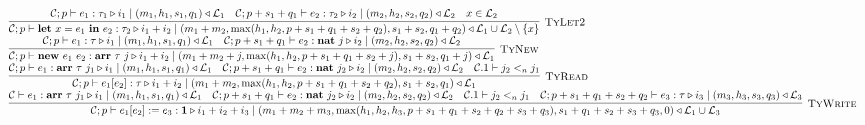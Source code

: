 \documentclass[fleqn]{article}
\begin{document}
\[\begin{array}{l}
\infer[\textsc{TyLet2}]{\jtygc{\mathcal{C};p }{ \mathbf{let}~x=e_1~\mathbf{in}~e_2 }{ \tau_2 }{ i_1 + i_2 }{ m_1 + m_2}{\max(h_1,h_2,p+s_1+q_1+s_2+q_2)}{s_1+s_2}{q_1+q_2}{\mathcal{L}_1 \cup \mathcal{L}_2 \setminus \{x\}} }{\jtygc{\mathcal{C};p }{ e_1 }{ \tau_1 }{ i_1 }{ m_1 }{h_1}{s_1}{q_1}{\mathcal{L}_1} & \jtygc{\mathcal{C};p+s_1+q_1 }{ e_2 }{ \tau_2 }{ i_2 }{ m_2}{h_2}{s_2}{q_2}{\mathcal{L}_2} & x \in \mathcal{L}_2 } \\

\infer[\textsc{TyNew}]{\jtygc{\mathcal{C};p }{ \mathbf{new}~e_1~e_2 }{ \mathbf{arr}~\tau~j }{ i_1 + i_2 }{ m_1 + m_2 + j}{\max(h_1,h_2,p+s_1+q_1+s_2+j) }{s_1+s_2}{q_1+j}{\mathcal{L}_1} }{\jtygc{\mathcal{C};p }{ e_1 }{\tau }{ i_1 }{ m_1}{h_1}{s_1}{q_1}{\mathcal{L}_1}  & \jtygc{\mathcal{C};p+s_1+q_1 }{ e_2 }{ \mathbf{nat}~j }{ i_2 }{ m_2}{h_2}{s_2}{q_2}{\mathcal{L}_2 } } \\

\infer[\textsc{TyRead}]{\jtygc{\mathcal{C};p }{ e_1[e_2] }{ \tau }{ i_1 + i_2 }{ m_1 + m_2}{\max(h_1,h_2,p+s_1+q_1+s_2+q_2)}{s_1+s_2}{q_1}{\mathcal{L}_1} }{\jtygc{\mathcal{C};p }{ e_1 }{ \mathbf{arr}~\tau~j_1 }{ i_1 }{ m_1}{h_1}{s_1}{q_1}{\mathcal{L}_1} & \jtygc{\mathcal{C};p+s_1+q_1 }{ e_2 }{ \mathbf{nat}~j_2 }{ i_2 }{ m_2}{h_2}{s_2}{q_2}{\mathcal{L}_2} & \mathcal{C}.1 \vdash j_2 <_n j_1 } \\

\infer[\textsc{TyWrite}]{\jtygc{\mathcal{C};p }{ e_1[e_2] := e_3 }{ \mathbf{1} }{ i_1 + i_2 + i_3 }{ m_1 + m_2 + m_3}{\max(h_1,h_2,h_3,p+s_1+q_1+s_2+q_2+s_3+q_3)}{s_1+q_1+s_2+s_3+q_3}{0}{\mathcal{L}_1 \cup \mathcal{L}_3} }{\jtygc{\mathcal{C} }{ e_1 }{ \mathbf{arr}~\tau~j_1 }{ i_1 }{ m_1}{h_1}{s_1}{q_1}{\mathcal{L}_1} & \jtygc{\mathcal{C};p+s_1+q_1 }{ e_2 }{\mathbf{nat}~j_2 }{ i_2 }{ m_2}{h_2}{s_2}{q_2}{\mathcal{L}_2} & \mathcal{C}.1 \vdash j_2 <_n j_1 & \jtygc{\mathcal{C};p+s_1+q_1+s_2+q_2 }{ e_3 }{ \tau }{ i_3 }{ m_3}{h_3}{s_3}{q_3}{\mathcal{L}_3} } \\



\end{array}
\]
\end{document}
